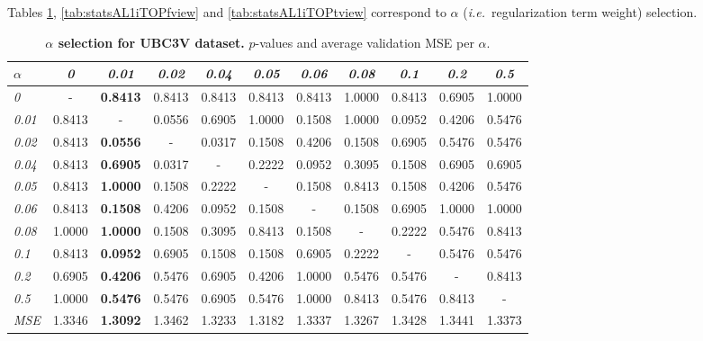 \documentclass[review,12pt,3p]{elsarticle}
\def \ie{\textit{i.e.}}
\begin{document}
Tables \ref{tab:statsAL1UBC3V}, \ref{tab:statsAL1iTOPfview} and \ref{tab:statsAL1iTOPtview} correspond to $\alpha$ (\ie~regularization term weight) selection.

\begin{table}[t]
\caption{\textbf{$\alpha$ selection for UBC3V dataset.} $p$-values and average validation MSE per $\alpha$.}
\label{tab:statsAL1UBC3V}
\scriptsize %
\begin{center}
\setlength{\tabcolsep}{0.2em} %
\begin{tabular}{|l|c c c c c c c c c c|}
\hline
 $\alpha$ & \emph{0} &\emph{0.01} & \emph{0.02} & \emph{0.04}&\emph{0.05} & \emph{0.06}& \emph{0.08}& \emph{0.1}& \emph{0.2}& \emph{0.5}\\
\hline \emph{0} & - & \textbf{0.8413} & 0.8413 & 0.8413 & 0.8413 & 0.8413 & 1.0000 & 0.8413 & 0.6905 & 1.0000  \\
  \hline \emph{0.01} & 0.8413 & - & 0.0556 & 0.6905 & 1.0000 & 0.1508 & 1.0000 & 0.0952 & 0.4206 & 0.5476  \\
  \hline \emph{0.02} & 0.8413 & \textbf{0.0556} & - & 0.0317 & 0.1508 & 0.4206 & 0.1508 & 0.6905 & 0.5476 & 0.5476  \\
  \hline \emph{0.04} & 0.8413 & \textbf{0.6905} & 0.0317 & - & 0.2222 & 0.0952 & 0.3095 & 0.1508 & 0.6905 & 0.6905  \\
  \hline \emph{0.05} & 0.8413 & \textbf{1.0000} & 0.1508 & 0.2222 & - & 0.1508 & 0.8413 & 0.1508 & 0.4206 & 0.5476  \\
  \hline \emph{0.06} & 0.8413 & \textbf{0.1508} & 0.4206 & 0.0952 & 0.1508 & - & 0.1508 & 0.6905 & 1.0000 & 1.0000  \\
  \hline \emph{0.08} & 1.0000 & \textbf{1.0000} & 0.1508 & 0.3095 & 0.8413 & 0.1508 & - & 0.2222 & 0.5476 & 0.8413  \\
  \hline \emph{0.1} & 0.8413 & \textbf{0.0952} & 0.6905 & 0.1508 & 0.1508 & 0.6905 & 0.2222 & - & 0.5476 & 0.5476  \\
  \hline \emph{0.2} & 0.6905 & \textbf{0.4206} & 0.5476 & 0.6905 & 0.4206 & 1.0000 & 0.5476 & 0.5476 & - & 0.8413  \\
  \hline \emph{0.5} & 1.0000 & \textbf{0.5476} & 0.5476 & 0.6905 & 0.5476 & 1.0000 & 0.8413 & 0.5476 & 0.8413 & -  \\
\hline 
\hline
\textit{MSE} &  1.3346  &   \textbf{1.3092}  &  1.3462  &  1.3233 &   1.3182 &   1.3337 &   1.3267  &  1.3428 &    1.3441 &    1.3373\\
\hline
\end{tabular} 
\end{center}
\end{table}
\end{document}
